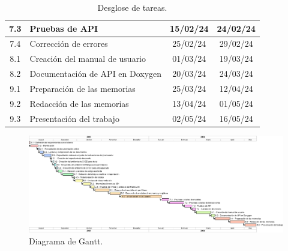 \begin{table}[ht]
\begin{tabularx}{\linewidth}{@{}|c|X|c|c|@{}}
    7.3 & Pruebas de API & 15/02/24 & 24/02/24\\ \hline
    7.4 & Corrección de errores & 25/02/24 & 29/02/24\\ \hline
    8.1 & Creación del manual de usuario & 01/03/24 & 19/03/24\\ \hline
    8.2 & Documentación de API en Doxygen & 20/03/24 & 24/03/24\\ \hline
    9.1 & Preparación de las memorias & 25/03/24 & 12/04/24\\ \hline
    9.2 & Redacción de las memorias & 13/04/24 & 01/05/24\\ \hline
    9.3 & Presentación del trabajo & 02/05/24 & 16/05/24\\ \hline
  \end{tabularx}
  \caption{Desglose de tareas.}
  \label{tab:wbs}
\end{table}


\begin{landscape}

  \begin{figure}[htpb]
    \centering
    \includegraphics[width=1.5\textwidth]{./assets/Gantt.png}
    \caption{Diagrama de Gantt.}
    \label{fig:Gantt}
  \end{figure}

  \vspace{25px}


\end{landscape}
